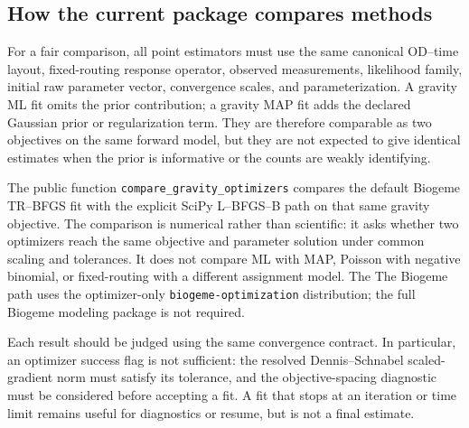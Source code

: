 







\subsection{How the current package compares methods}

For a fair comparison, all point estimators must use the same canonical
OD--time layout, fixed-routing response operator, observed measurements,
likelihood family, initial raw parameter vector, convergence scales, and
parameterization.  A gravity ML fit omits the prior contribution; a gravity
MAP fit adds the declared Gaussian prior or regularization term.  They are
therefore comparable as two objectives on the same forward model, but they are
not expected to give identical estimates when the prior is informative or the
counts are weakly identifying.

The public function
\texttt{compare\_gravity\_optimizers} compares the default Biogeme TR--BFGS
fit with the explicit SciPy L--BFGS--B path on that same gravity objective.
The comparison is numerical rather than scientific: it asks whether two
optimizers reach the same objective and parameter solution under common
scaling and tolerances.  It does not compare ML with MAP, Poisson with
negative binomial, or fixed-routing with a different assignment model.  The
The Biogeme path uses the optimizer-only
\texttt{biogeme-optimization} distribution; the full Biogeme modeling package
is not required.

Each result should be judged using the same convergence contract.  In
particular, an optimizer success flag is not sufficient: the resolved
Dennis--Schnabel scaled-gradient norm must satisfy its tolerance, and the
objective-spacing diagnostic must be considered before accepting a fit.  A
fit that stops at an iteration or time limit remains useful for diagnostics or
resume, but is not a final estimate.

